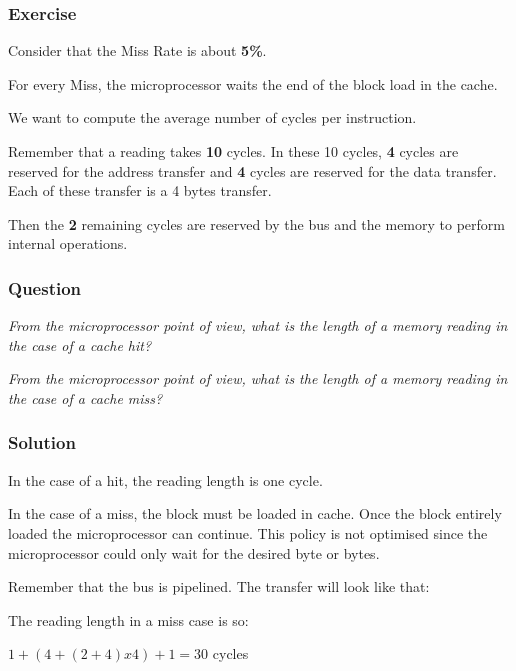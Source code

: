 \begin{frame}
  \frametitle{Exercise}

  Consider that the Miss Rate is about \textbf{5\%}.

  \nl

  For every Miss, the microprocessor waits the end of the block
  load in the cache.

  \nl

  We want to compute the average number of cycles per instruction.

  \nl

  Remember that a reading takes \textbf{10} cycles. In these 10 cycles,
  \textbf{4} cycles are reserved for the address transfer and \textbf{4}
  cycles are reserved for the data transfer. Each of these transfer is
  a 4 bytes transfer.

  \nl

  Then the \textbf{2} remaining cycles are reserved by the bus and the memory
  to perform internal operations.
\end{frame}


\begin{frame}
  \frametitle{Question}

  \textit{From the microprocessor point of view, what is the length of
    a memory reading in the case of a cache hit?}

  \nl

  \textit{From the microprocessor point of view, what is the length of
    a memory reading in the case of a cache miss?}
\end{frame}


\begin{frame}
  \frametitle{Solution}

  In the case of a hit, the reading length is one cycle.

  \nl

  In the case of a miss, the block must be loaded in cache. Once the block
  entirely loaded the microprocessor can continue. This policy is not
  optimised since the microprocessor could only wait for the desired byte
  or bytes.

  \nl

  Remember that the bus is pipelined. The transfer will look like that:

  \begin{center}
  \end{center}

  The reading length in a miss case is so:

  \nl

  $1 + (4 + (2 + 4) x 4) + 1 = 30$ cycles
\end{frame}


